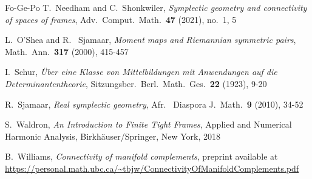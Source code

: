 \documentclass[12pt]{amsart}
\theoremstyle{definition}
\theoremstyle{remark}
\begin{document}
\begin{thebibliography}{Fo-Ge-Po}
 T.~Needham and C.~Shonkwiler, {\it Symplectic geometry and connectivity of spaces of frames},  Adv.~Comput.~Math.~{\bf 47} (2021), no.~1, 5

 L.~O’Shea and R.~ Sjamaar, {\it Moment maps and Riemannian symmetric pairs},
Math.~Ann.~{\bf 317} (2000), 415-457 



 I.~Schur, {\it \"Uber eine Klasse von Mittelbildungen mit Anwendungen auf die Determinantentheorie}, 
Sitzungsber.~Berl.~Math.~Ges.~{\bf 22} (1923), 9-20

 R.~Sjamaar, {\it  Real symplectic geometry},
Afr.~ Diaspora J.~Math.~{\bf 9} (2010), 34-52



 

 S.~Waldron, {\it An Introduction to Finite Tight Frames},
Applied and Numerical Harmonic Analysis, Birkh\"auser/Springer, New York, 2018


 B.~Williams, {\it Connectivity of manifold complements}, preprint available at
\url{https://personal.math.ubc.ca/~tbjw/ConnectivityOfManifoldComplements.pdf}

\end{thebibliography}
\end{document}
